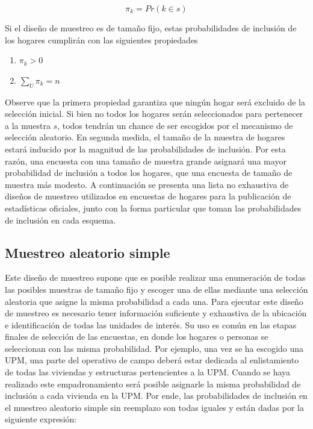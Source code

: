 \documentclass[
  12pt,
]{book}
\providecommand{\tightlist}{%
  \setlength{\itemsep}{0pt}\setlength{\parskip}{0pt}}
\begin{document}
\[\pi_k = Pr (k \in s)\]

Si el diseño de muestreo es de tamaño fijo, estas probabilidades de inclusión de los hogares cumplirán con las siguientes propiedades

\begin{enumerate}
\def\labelenumi{\arabic{enumi}.}
\tightlist
\item
  \(\pi_k > 0\)
\item
  \(\sum_U \pi_k = n\)
\end{enumerate}

Observe que la primera propiedad garantiza que ningún hogar será excluido de la selección inicial. Si bien no todos los hogares serán seleccionados para pertenecer a la muestra \(s\), todos tendrán un chance de ser escogidos por el mecanismo de selección aleatorio. En segunda medida, el tamaño de la muestra de hogares estará inducido por la magnitud de las probabilidades de inclusión. Por esta razón, una encuesta con una tamaño de muestra grande asignará una mayor probabilidad de inclusión a todos los hogares, que una encuesta de tamaño de muestra más modesto. A continuación se presenta una lista no exhaustiva de diseños de muestreo utilizados en encuestas de hogares para la publicación de estadísticas oficiales, junto con la forma particular que toman las probabilidades de inclusión en cada esquema.

\hypertarget{muestreo-aleatorio-simple}{%
\subsection{Muestreo aleatorio simple}\label{muestreo-aleatorio-simple}}

Este diseño de muestreo supone que es posible realizar una enumeración de todas las posibles muestras de tamaño fijo y escoger una de ellas mediante una selección aleatoria que asigne la misma probabilidad a cada una. Para ejecutar este diseño de muestreo es necesario tener información suficiente y exhaustiva de la ubicación e identificación de todas las unidades de interés. Su uso es común en las etapas finales de selección de las encuestas, en donde los hogares o personas se seleccionan con las misma probabilidad. Por ejemplo, una vez se ha escogido una UPM, una parte del operativo de campo deberá estar dedicada al enlistamiento de todas las viviendas y estructuras pertencientes a la UPM. Cuando se haya realizado este empadronamiento será posible asignarle la misma probabilidad de inclusión a cada vivienda en la UPM. Por ende, las probabilidades de inclusión en el muestreo aleatorio simple sin reemplazo son todas iguales y están dadas por la siguiente expresión:
\end{document}
